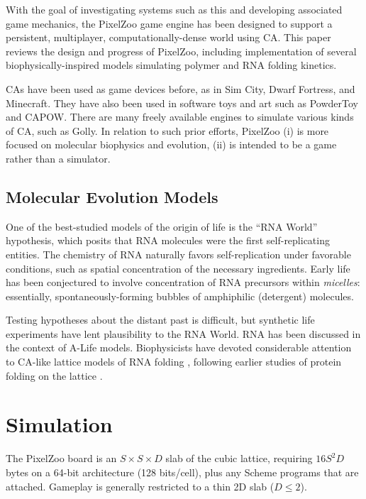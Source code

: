 \documentclass{acm_proc_article-sp}
\begin{document}
With the goal of investigating systems such as this and developing associated game mechanics,
the PixelZoo game engine has been designed to support
a persistent, multiplayer, computationally-dense world using CA.
This paper reviews the design and progress of PixelZoo,
including implementation of several biophysically-inspired models
simulating polymer and RNA folding kinetics.

CAs have been used as game devices before,
as in Sim City, %
Dwarf Fortress, %
and Minecraft. %
They have also been used in software toys and art such as
PowderToy %
and CAPOW. %
There are many freely available engines to simulate various kinds of CA, such as Golly. %
In relation to such prior efforts, PixelZoo
(i) is more focused on molecular biophysics and evolution,
(ii) is intended to be a game rather than a simulator.

\subsection{Molecular Evolution Models}

One of the best-studied models of the origin of life is the ``RNA World'' hypothesis,
which posits that RNA molecules were the first self-replicating entities\cite{Woese1967}.
The chemistry of RNA naturally favors self-replication under favorable conditions,
such as spatial concentration of the necessary ingredients.
Early life has been conjectured to involve concentration of RNA precursors within {\em micelles}:
essentially, spontaneously-forming bubbles of amphiphilic (detergent) molecules.

Testing hypotheses about the distant past is difficult, but synthetic life experiments
have lent plausibility to the RNA World\cite{PaulJoyce2002}.
RNA has been discussed in the context of A-Life models\cite{journals/alife/Schuster94}.
Biophysicists have devoted considerable attention to CA-like lattice models of RNA folding
\cite{LeoniVanderzande2003,JostEveraers2010,ZaraPretti2007,GillespieMayneJiang2009},
following earlier studies of protein folding on the lattice \cite{Dill1985,PandeRokhsar1999}.

\section{Simulation}

The PixelZoo board is
an $S \times S \times D$ slab of the cubic lattice,
requiring $16S^2 D$ bytes on a 64-bit architecture (128 bits/cell),
plus any Scheme programs that are attached.
Gameplay is generally restricted to a thin 2D slab ($D \leq 2$).
\end{document}
